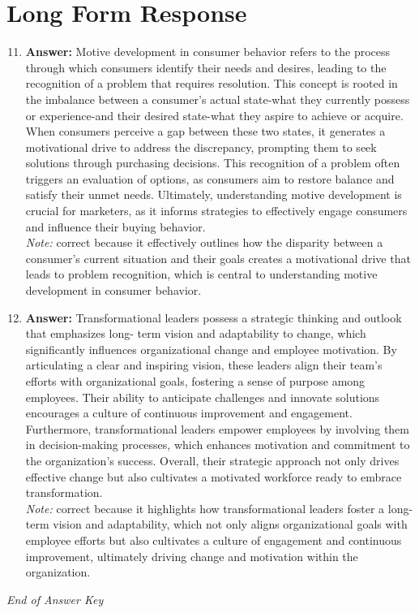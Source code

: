 \documentclass[12pt]{article}
\begin{document}
\section*{Long Form Response}
\begin{enumerate}[label=\arabic*.]
\setcounter{enumi}{10}
\item \textbf{Answer:} Motive development in consumer behavior refers to the process through which consumers identify their needs and desires, leading to the recognition of a problem that requires resolution. This concept is rooted in the imbalance between a consumer's actual state-what they currently possess or experience-and their desired state-what they aspire to achieve or acquire. When consumers perceive a gap between these two states, it generates a motivational drive to address the discrepancy, prompting them to seek solutions through purchasing decisions. This recognition of a problem often triggers an evaluation of options, as consumers aim to restore balance and satisfy their unmet needs. Ultimately, understanding motive development is crucial for marketers, as it informs strategies to effectively engage consumers and influence their buying behavior.
\\ \textit{Note:} correct because it effectively outlines how the disparity between a consumer's current situation and their goals creates a motivational drive that leads to problem recognition, which is central to understanding motive development in consumer behavior.
\item \textbf{Answer:} Transformational leaders possess a strategic thinking and outlook that emphasizes long- term vision and adaptability to change, which significantly influences organizational change and employee motivation. By articulating a clear and inspiring vision, these leaders align their team's efforts with organizational goals, fostering a sense of purpose among employees. Their ability to anticipate challenges and innovate solutions encourages a culture of continuous improvement and engagement. Furthermore, transformational leaders empower employees by involving them in decision-making processes, which enhances motivation and commitment to the organization's success. Overall, their strategic approach not only drives effective change but also cultivates a motivated workforce ready to embrace transformation.
\\ \textit{Note:} correct because it highlights how transformational leaders foster a long-term vision and adaptability, which not only aligns organizational goals with employee efforts but also cultivates a culture of engagement and continuous improvement, ultimately driving change and motivation within the organization.
\end{enumerate}

\vfill
\noindent\textit{End of Answer Key}
\end{document}
